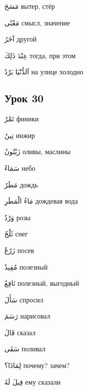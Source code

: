 \documentclass[a5paper]{article}
\newcommand\textstyleDropCaps[1]{#1}
\newcommand\textstyleCaptioncharacters[1]{#1}
\begin{document}
\textstyleCaptioncharacters{مَسَحَ }\textstyleDropCaps{вытер, стёр‎}

\textstyleCaptioncharacters{مَعْنًى }\textstyleDropCaps{смысл, значение‎}

\textstyleCaptioncharacters{آخَرُ }\textstyleDropCaps{другой‎}

\textstyleCaptioncharacters{عِنْدَ ذَلِكَ }\textstyleDropCaps{тогда, при этом‎}

\textstyleCaptioncharacters{اَلدُّنْيَا بَرْدٌ }\textstyleDropCaps{на улице хо­лодно‎}

\subsection[Урок 30‎]{\textstyleDropCaps{Урок 30‎}}
\textstyleCaptioncharacters{تَمْرٌ }\textstyleDropCaps{финики‎}

\textstyleCaptioncharacters{تِينٌ }\textstyleDropCaps{инжир‎}

\textstyleCaptioncharacters{زَيْتُونٌ }\textstyleDropCaps{оливы, маслины‎}

\textstyleCaptioncharacters{سَمَاءٌ }\textstyleDropCaps{небо‎}

\textstyleCaptioncharacters{مَطَرٌ }\textstyleDropCaps{дождь‎}

\textstyleCaptioncharacters{مَاءُ الْمَطَرِ }\textstyleDropCaps{дождевая вода‎}

\textstyleCaptioncharacters{وَرْدٌ }\textstyleDropCaps{розы‎}

\textstyleCaptioncharacters{ثَلْجٌ }\textstyleDropCaps{снег‎}

\textstyleCaptioncharacters{زَرْعٌ }\textstyleDropCaps{посев‎}

\textstyleCaptioncharacters{مُفِيدٌ }\textstyleDropCaps{полезный‎}

\textstyleCaptioncharacters{نَافِعٌ }\textstyleDropCaps{полезный, выгодный‎}

\textstyleCaptioncharacters{سَأَلَ }\textstyleDropCaps{спросил‎}

\textstyleCaptioncharacters{رَسَمَ }\textstyleDropCaps{нарисовал‎}

\textstyleCaptioncharacters{قَالَ }\textstyleDropCaps{сказал‎}

\textstyleCaptioncharacters{سَقَى }\textstyleDropCaps{поливал‎}

\textstyleCaptioncharacters{لِمَاذَا؟ }\textstyleDropCaps{почему? зачем?‎}

\textstyleCaptioncharacters{قِيلَ لَهُ }\textstyleDropCaps{ему сказали‎}
\end{document}
